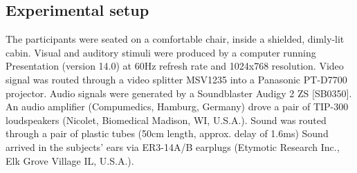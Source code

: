 \subsection{Experimental setup}
The participants were seated on a comfortable chair, inside a shielded, dimly-lit cabin.
Visual and auditory stimuli were produced by a computer running Presentation (version 14.0) at 60Hz refresh rate and 1024x768 resolution.
Video signal was routed through a video splitter MSV1235 into a Panasonic PT-D7700 projector.
Audio signals were generated by a Soundblaster Audigy 2 ZS [SB0350].
An audio amplifier (Compumedics, Hamburg, Germany) drove a pair of TIP-300 loudspeakers (Nicolet, Biomedical Madison, WI, U.S.A.).
Sound was routed through a pair of plastic tubes (50cm length, approx. delay of 1.6ms)
Sound arrived in the subjects' ears via ER3-14A/B earplugs (Etymotic Research Inc., Elk Grove Village IL, U.S.A.).


